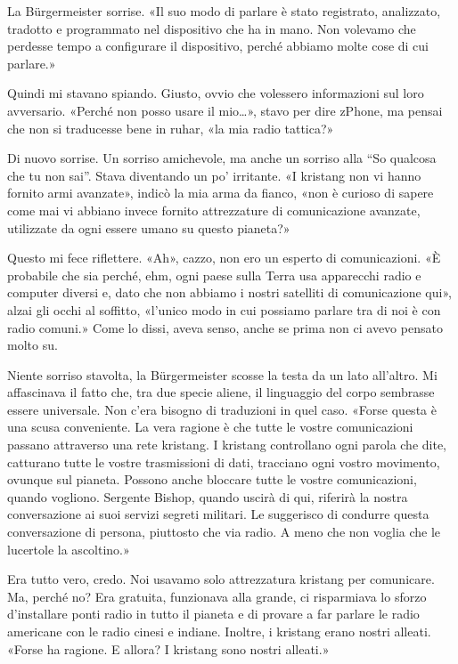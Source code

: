 La Bürgermeister sorrise. «Il suo modo di parlare è stato registrato,
analizzato, tradotto e programmato nel dispositivo che ha in mano. Non
volevamo che perdesse tempo a configurare il dispositivo, perché abbiamo
molte cose di cui parlare.»

Quindi mi stavano spiando. Giusto, ovvio che volessero informazioni sul
loro avversario. «Perché non posso usare il mio\ldots», stavo per dire
zPhone, ma pensai che non si traducesse bene in ruhar, «la mia radio
tattica?»

Di nuovo sorrise. Un sorriso amichevole, ma anche un sorriso alla ``So
qualcosa che tu non sai''. Stava diventando un po' irritante. «I
kristang non vi hanno fornito armi avanzate», indicò la mia arma da
fianco, «non è curioso di sapere come mai vi abbiano invece fornito
attrezzature di comunicazione avanzate, utilizzate da ogni essere umano
su questo pianeta?»

Questo mi fece riflettere. «Ah», cazzo, non ero un esperto di
comunicazioni. «È probabile che sia perché, ehm, ogni paese sulla Terra
usa apparecchi radio e computer diversi e, dato che non abbiamo i nostri
satelliti di comunicazione qui», alzai gli occhi al soffitto, «l'unico
modo in cui possiamo parlare tra di noi è con radio comuni.» Come lo
dissi, aveva senso, anche se prima non ci avevo pensato molto su.

Niente sorriso stavolta, la Bürgermeister scosse la testa da un lato
all'altro. Mi affascinava il fatto che, tra due specie aliene, il
linguaggio del corpo sembrasse essere universale. Non c'era bisogno di
traduzioni in quel caso. «Forse questa è una scusa conveniente. La vera
ragione è che tutte le vostre comunicazioni passano attraverso una rete
kristang. I kristang controllano ogni parola che dite, catturano tutte
le vostre trasmissioni di dati, tracciano ogni vostro movimento, ovunque
sul pianeta. Possono anche bloccare tutte le vostre comunicazioni,
quando vogliono. Sergente Bishop, quando uscirà di qui, riferirà la
nostra conversazione ai suoi servizi segreti militari. Le suggerisco di
condurre questa conversazione di persona, piuttosto che via radio. A
meno che non voglia che le lucertole la ascoltino.»

Era tutto vero, credo. Noi usavamo solo attrezzatura kristang per
comunicare. Ma, perché no? Era gratuita, funzionava alla grande, ci
risparmiava lo sforzo d'installare ponti radio in tutto il pianeta e di
provare a far parlare le radio americane con le radio cinesi e indiane.
Inoltre, i kristang erano nostri alleati. «Forse ha ragione. E allora? I
kristang sono nostri alleati.»

